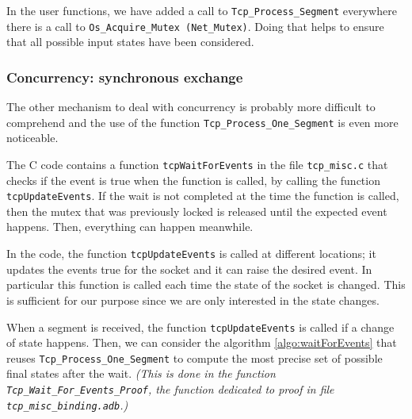 \documentclass[a4paper, 10pt]{article}
\begin{document}
    In the user functions, we have added a call to \lstinline[language=Ada]{Tcp_Process_Segment} everywhere
    there is a call to \lstinline{Os_Acquire_Mutex (Net_Mutex)}. Doing that helps to ensure that all 
    possible input states have been considered.

    \subsubsection{Concurrency: synchronous exchange}
    \label{section:synchronous}

    The other mechanism to deal with concurrency is probably more difficult to comprehend and the
    use of the function \lstinline[language=Ada]{Tcp_Process_One_Segment} is even more noticeable.
    
    The C code contains a function \lstinline[language=C]{tcpWaitForEvents} in the file \texttt{tcp\_misc.c}
    that checks if the event is true when the function is called, by calling the function
    \lstinline[language=C]{tcpUpdateEvents}. If the wait is not completed at the time the function is
    called, then the mutex that was previously locked is released until the expected event happens.
    Then, everything can happen meanwhile.
    
    In the code, the function \lstinline[language=C]{tcpUpdateEvents} is called at different locations; it
    updates the events true for the socket and it can raise the desired event.
    In particular this function is called each time the state of
    the socket is changed. This is sufficient for our purpose since we are only interested in the state
    changes.

    When a segment is received, the function \lstinline[language=C]{tcpUpdateEvents} is called if a
    change of state happens. Then, we can consider the algorithm \ref{algo:waitForEvents} that reuses
    \lstinline[language=Ada]{Tcp_Process_One_Segment} to compute the most precise set of possible
    final states after the wait. \textit{(This is done in the function \lstinline[language=Ada]{Tcp_Wait_For_Events_Proof},
    the function dedicated to proof in file \texttt{tcp\_misc\_binding.adb}.)}
\end{document}
